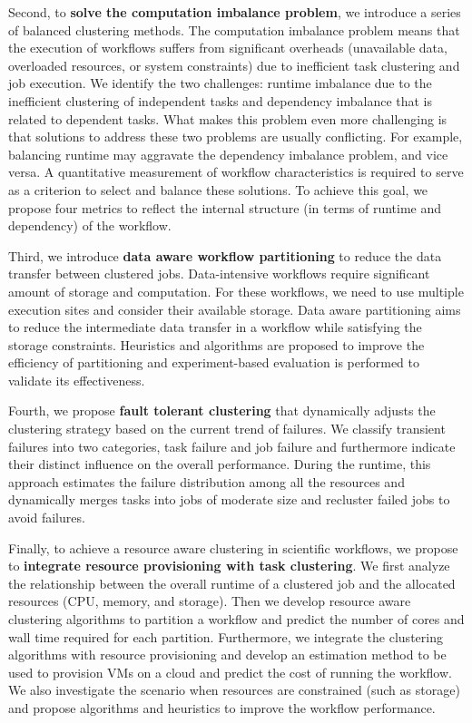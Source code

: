 Second, to \textbf{solve the computation imbalance problem}, we introduce a series of balanced clustering methods. The computation imbalance problem means that the execution of workflows suffers from significant overheads (unavailable data, overloaded resources, or system constraints) due to inefficient task clustering and job execution. We identify the two challenges: runtime imbalance due to the inefficient clustering of independent tasks and dependency imbalance that is related to dependent tasks. What makes this problem even more challenging is that solutions to address these two problems are usually conflicting. For example, balancing runtime may aggravate the dependency imbalance problem, and vice versa. A quantitative measurement of workflow characteristics is required to serve as a criterion to select and balance these solutions. To achieve this goal, we propose four metrics to reflect the internal structure (in terms of runtime and dependency) of the workflow. 

Third, we introduce \textbf{data aware workflow partitioning} to reduce the data transfer between clustered jobs. Data-intensive workflows require significant amount of storage and computation. For these workflows, we need to use multiple execution sites and consider their available storage. Data aware partitioning aims to reduce the intermediate data transfer in a workflow while satisfying the storage constraints. Heuristics and algorithms are proposed to improve the efficiency of partitioning and experiment-based evaluation is performed to validate its effectiveness.  


Fourth, we propose \textbf{fault tolerant clustering} that dynamically adjusts the clustering strategy based on the current trend of failures. We classify transient failures into two categories, task failure and job failure and furthermore indicate their distinct influence on the overall performance. During the runtime, this approach estimates the failure distribution among all the resources and dynamically merges tasks into jobs of moderate size and recluster failed jobs to avoid failures.

Finally, to achieve a resource aware clustering in scientific workflows, we propose to \textbf{integrate resource provisioning with task clustering}. We first analyze the relationship between the overall runtime of a clustered job and the allocated resources (CPU, memory, and storage). Then we develop resource aware clustering algorithms to partition a workflow and predict the number of cores and wall time required for each partition. Furthermore,  we integrate the clustering algorithms with resource provisioning and develop an estimation method to be used to provision VMs on a cloud and predict the cost of running the workflow. We also investigate the scenario when resources are constrained (such as storage) and propose algorithms and heuristics to improve the workflow performance. 


